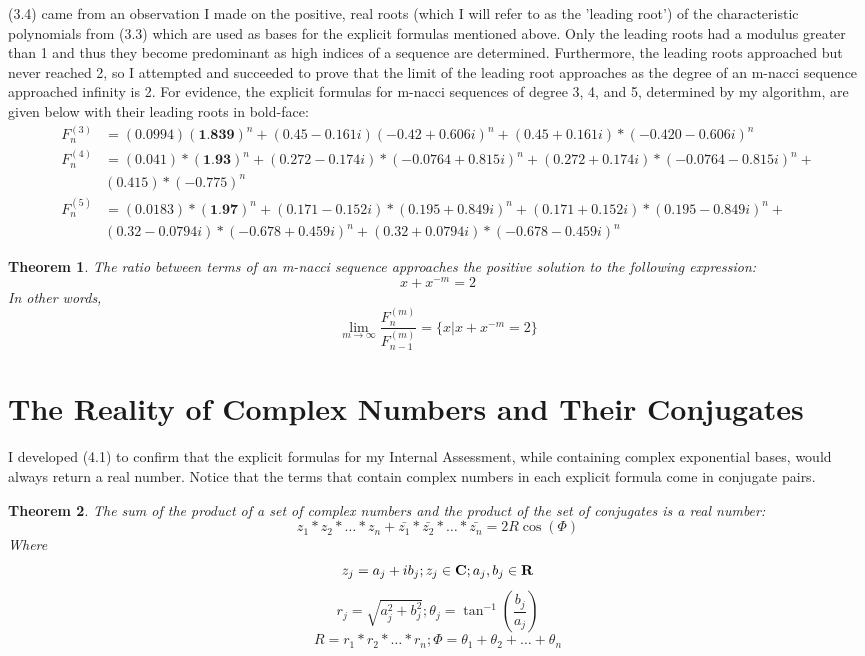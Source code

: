 \documentclass{article}
\newtheorem{theorem}{Theorem}[section]
\begin{document}
(3.4) came from an observation I made on the positive, real roots (which I will refer to as the 'leading root') of the characteristic polynomials from (3.3) which are used as bases for the explicit formulas mentioned above. Only the leading roots had a modulus greater than 1 and thus they become predominant as high indices of a sequence are determined. Furthermore, the leading roots approached but never reached 2, so I attempted and succeeded to prove that the limit of the leading root approaches as the degree of an m-nacci sequence approached infinity is 2.
For evidence, the explicit formulas for m-nacci sequences of degree 3, 4, and 5, determined by my algorithm, are given below with their leading roots in bold-face:
\begin{align*}
    F^{(3)}_n &= (0.0994)(\textbf{1.839})^n + (0.45 - 0.161i)(-0.42 + 0.606i)^n + (0.45 + 0.161i)*(-0.420 - 0.606i)^n \\
    F^{(4)}_n &= (0.041)*(\textbf{1.93})^n + (0.272 - 0.174i)*(-0.0764 + 0.815i)^n + (0.272 + 0.174i)*(-0.0764 - 0.815i)^n + \\ & (0.415)*(-0.775)^n \\
    F^{(5)}_n &= (0.0183)*(\textbf{1.97})^n + (0.171 - 0.152i)*(0.195 + 0.849i)^n + (0.171 + 0.152i)*(0.195 - 0.849i)^n + \\ & (0.32 - 0.0794i)*(-0.678 + 0.459i)^n + (0.32 + 0.0794i)*(-0.678 - 0.459i)^n
\end{align*}

\begin{theorem}
    The ratio between terms of an m-nacci sequence approaches the positive solution to the following expression:
    $$x+x^{-m}=2$$
    In other words, 
    $$\lim_{m \to \infty} \frac{F^{(m)}_n}{F^{(m)}_{n-1}}=\{x|x+x^{-m}=2\}$$
\end{theorem}

\section{The Reality of Complex Numbers and Their Conjugates}

I developed (4.1) to confirm that the explicit formulas for my Internal Assessment, while containing complex exponential bases, would always return a real number. Notice that the terms that contain complex numbers in each explicit formula come in conjugate pairs.

\begin{theorem}
    The sum of the product of a set of complex numbers and the product of the set of conjugates is a real number:
    $$z_1*z_2*\dots*z_n+\bar{z_1}*\bar{z_2}*\dots*\bar{z_n}=2R\cos{(\Phi)}$$
    Where
    $$z_j=a_j+ib_j;z_j\in\mbox{\textbf{C}};a_j,b_j\in\mbox{\textbf{R}}$$
    $$r_j=\sqrt{a_j^2+b_j^2};\theta_j=\tan^{-1}{\left(\frac{b_j}{a_j}\right)}$$
    $$R=r_1*r_2*\dots*r_n;\Phi=\theta_1+\theta_2+\dots+\theta_n$$
\end{theorem}
\end{document}
